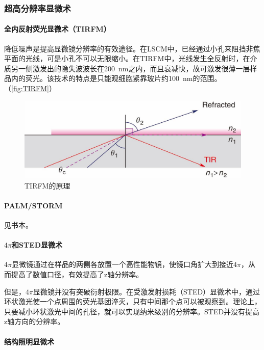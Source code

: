 \subsubsection{超高分辨率显微术}

\paragraph{全内反射荧光显微术（TIRFM）}

降低噪声是提高显微镜分辨率的有效途径。在LSCM中，已经通过小孔来阻挡非焦平面的光线，可是小孔不可以无限缩小。在TIRFM中，光线发生全反射时，在介质另一侧激发出的隐失波波长在\SI{200}{\nm}之内，而且衰减快，故可激发很薄一层样品内的荧光。该技术的特点是只能观细胞紧靠玻片约\SI{100}{\nm}的范围。（\autoref{fig:TIRFM}）

\begin{figure}
	\centering
	\includegraphics[width=0.7\linewidth]{Pics/TIMFR}
	\caption{TIRFM的原理}
	\label{fig:TIRFM}
\end{figure}


\paragraph{PALM/STORM}

见书本。

\paragraph{$4\pi$和STED显微术}

$4\pi$显微镜通过在样品的两侧各放置一个高性能物镜，使镜口角扩大到接近$4\pi$，从而提高了数值口径，有效提高了z轴分辨率。

但是，$4\pi$显微镜并没有突破衍射极限。在受激发射损耗（STED）显微术中，通过环状激光使一个点周围的荧光基团淬灭，只有中间那个点可以被观察到。理论上，只要减小环状激光中间的孔径，就可以实现纳米级别的分辨率。STED并没有提高z轴方向的分辨率。

\paragraph{结构照明显微术}

